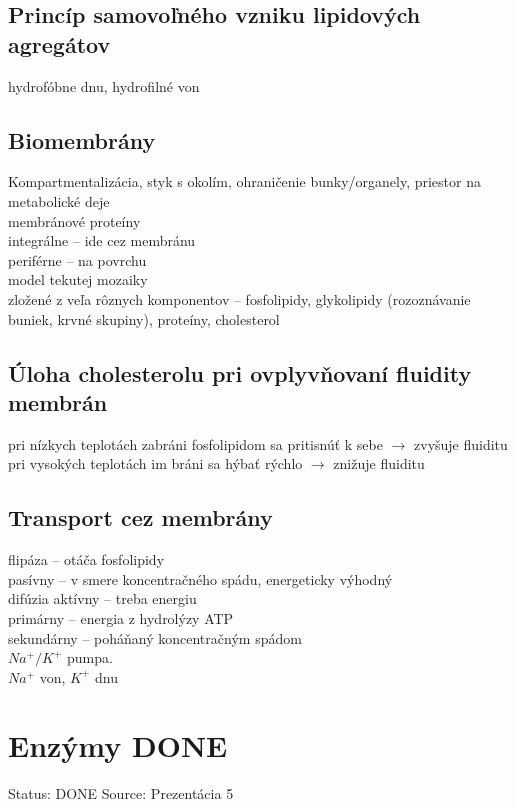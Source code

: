 \subsection*{Princíp samovoľného vzniku lipidových agregátov}
hydrofóbne dnu, hydrofilné von\\
\subsection*{Biomembrány}
Kompartmentalizácia, styk s okolím, ohraničenie bunky/organely, priestor na metabolické deje\\
membránové proteíny\\
\tab integrálne -- ide cez membránu\\
\tab periférne -- na povrchu\\
model tekutej mozaiky\\
\tab zložené z veľa rôznych komponentov -- fosfolipidy, glykolipidy (rozoznávanie buniek, krvné skupiny), proteíny, cholesterol\\
\subsection*{Úloha cholesterolu pri ovplyvňovaní fluidity membrán}
pri nízkych teplotách zabráni fosfolipidom sa pritisnúť k sebe $\rightarrow$ zvyšuje fluiditu\\
pri vysokých teplotách im bráni sa hýbať rýchlo $\rightarrow$ znižuje fluiditu\\
\subsection*{Transport cez membrány}
flipáza -- otáča fosfolipidy\\
pasívny -- v smere koncentračného spádu, energeticky výhodný\\
\tab difúzia
aktívny -- treba energiu\\
\tab primárny -- energia z hydrolýzy ATP\\
\tab sekundárny -- poháňaný koncentračným spádom\\
$Na^+/K^+$ pumpa.\\
\tab $Na^+$ von, $K^+$ dnu
\\
\section{Enzýmy DONE}

Status: DONE
Source: Prezentácia 5


